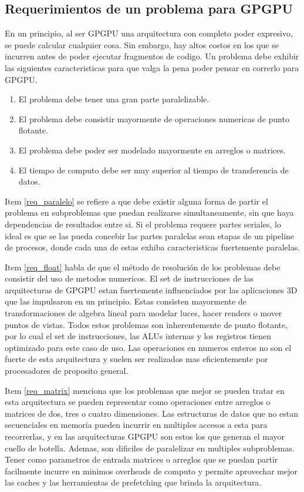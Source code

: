 \subsection{Requerimientos de un problema para GPGPU}
En un principio, al ser GPGPU una arquitectura con completo poder expresivo, se puede
calcular cualquier cosa. Sin embargo, hay altos costos en los que se incurren antes de
poder ejecutar fragmentos de codigo. Un problema debe exhibir las siguientes caracteristicas
para que valga la pena poder pensar en correrlo para GPGPU.
\begin{enumerate}
  \item El problema debe tener una gran parte paralelizable.
  \item El problema debe consistir mayormente de operaciones numericas de punto flotante.
  \item El problema debe poder ser modelado mayormente en arreglos o matrices.
  \item El tiempo de computo debe ser muy superior al tiempo de transferencia de datos.
\end{enumerate}

Item \ref{req_paralelo} se refiere a que debe existir alguna forma de partir el problema
en subproblemas que puedan realizarse simultaneamente, sin que haya dependencias de 
resultados entre si. Si el problema requere partes seriales, lo ideal es que se las
pueda concebir las partes paralelas sean etapas de un pipeline de procesos, donde 
cada una de estas exhiba caracteristicas fuertemente paralelas.

Item \ref{req_float} habla de que el m\'etodo de resoluci\'on de los problemas debe
consistir del uso de metodos numericos. El set de instrucciones de las arquitecturas
de GPGPU estan fuertemente influenciados por las aplicaciones 3D que las impulsaron
en un principio. Estas consisten mayormente de transformaciones de algebra lineal
para modelar luces, hacer renders o mover puntos de vistas. Todos estos problemas
son inherentemente de punto flotante, por lo cual el set de instrucciones, las ALUs
internas y los registros tienen optimizado para este caso de uso. Las operaciones
en numeros enteros no son el fuerte de esta arquitectura y suelen ser realizados
mas eficientemente por procesadores de proposito general.

Item \ref{req_matrix} menciona que los problemas que mejor se pueden tratar en esta
arquitectura se pueden representar como operaciones entre arreglos o matrices de
dos, tres o cuatro dimensiones. Las estructuras de datos que no estan secuenciales
en memoria pueden incurrir en multiples accesos a esta para recorrerlas, y en las
arquitecturas GPGPU son estos los que generan el mayor cuello de botella. Ademas,
son dificiles de paralelizar en multiples subproblemas. Tener como parametros de 
entrada matrices o arreglos que se puedan partir facilmente incurre en minimos
overheads de computo y permite aprovechar mejor las caches y las herramientas de
prefetching que brinda la arquitectura.

